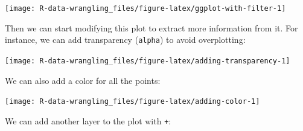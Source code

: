 \documentclass[]{book}
\newenvironment{Shaded}{\begin{snugshade}}{\end{snugshade}}
\newcommand{\DataTypeTok}[1]{\textcolor[rgb]{0.13,0.29,0.53}{#1}}
\newcommand{\FloatTok}[1]{\textcolor[rgb]{0.00,0.00,0.81}{#1}}
\newcommand{\KeywordTok}[1]{\textcolor[rgb]{0.13,0.29,0.53}{\textbf{#1}}}
\newcommand{\NormalTok}[1]{#1}
\newcommand{\OperatorTok}[1]{\textcolor[rgb]{0.81,0.36,0.00}{\textbf{#1}}}
\newcommand{\StringTok}[1]{\textcolor[rgb]{0.31,0.60,0.02}{#1}}
\begin{document}
\texttt{[image: R-data-wrangling\_files/figure-latex/ggplot-with-filter-1]}

Then we can start modifying this plot to extract more information from it. For instance, we can add transparency (\texttt{alpha}) to avoid overplotting:

\begin{Shaded}
\end{Shaded}

\texttt{[image: R-data-wrangling\_files/figure-latex/adding-transparency-1]}

We can also add a color for all the points:

\begin{Shaded}
\end{Shaded}

\texttt{[image: R-data-wrangling\_files/figure-latex/adding-color-1]}

We can add another layer to the plot with \texttt{+}:
\end{document}
